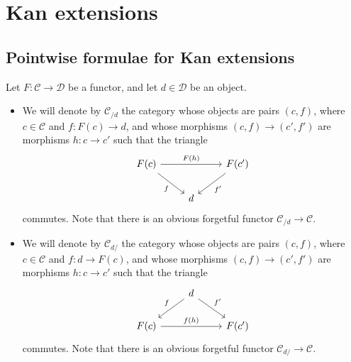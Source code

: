 \documentclass[main.tex]{subfiles}
\begin{document}
\section{Kan extensions}
\label{sec:kan_extensions}

\subsection{Pointwise formulae for Kan extensions}
\label{ssc:pointwise_formulae_for_kan_extensions}

Let $F\colon \mathcal{C} \to \mathcal{D}$ be a functor, and let $d \in \mathcal{D}$ be an object.
\begin{itemize}
  \item We will denote by $\mathcal{C}_{/d}$ the category whose objects are pairs $(c, f)$, where $c \in \mathcal{C}$ and $f\colon F(c) \to d$, and whose morphisms $(c, f) \to (c', f')$ are morphisms $h\colon c \to c'$ such that the triangle
    \begin{equation*}
      \begin{tikzcd}
        F(c)
        \arrow[rr, "F(h)"]
        \arrow[dr, swap, "f"]
        && F(c')
        \arrow[dl, "f'"]
        \\
        & d
      \end{tikzcd}
    \end{equation*}
    commutes. Note that there is an obvious forgetful functor $\mathcal{C}_{/d} \to \mathcal{C}$.

  \item We will denote by $\mathcal{C}_{d/}$ the category whose objects are pairs $(c, f)$, where $c \in \mathcal{C}$ and $f\colon d \to F(c)$, and whose morphisms $(c, f) \to (c', f')$ are morphisms $h\colon c \to c'$ such that the triangle
    \begin{equation*}
      \begin{tikzcd}
        & d
        \arrow[dl, swap, "f"]
        \arrow[dr, "f'"]
        \\
        F(c)
        \arrow[rr, "f(h)"]
        && F(c')
      \end{tikzcd}
    \end{equation*}
    commutes. Note that there is an obvious forgetful functor $\mathcal{C}_{d/} \to \mathcal{C}$.
\end{itemize}
\end{document}
